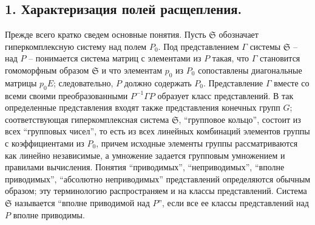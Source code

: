 \documentclass[11pt]{article}
\newcommand{\mS}{\mathfrak{S}}
\begin{document}
\subsection*{1. Характеризация полей расщепления.}

\noindent Прежде всего кратко сведем основные понятия. Пусть $\mS$ обозначает гиперкомплексную систему над полем $P_0$. Под представлением $\Gamma$ системы $\mS$ -- над $P$ -- понимается система матриц с элементами из $P$ такая, что $\Gamma$ становится гомоморфным образом $\mS$ и что элементам $p_0$ из $P_0$ сопоставлены диагональные матрицы $p_0E$; следовательно, $P$ должно содержать $P_0$. Представление $\Gamma$ вместе со всеми своими преобразованными $P^{-1}\Gamma P$ образует класс представлений. В так определенные представления входят также представления конечных групп $G$; соответствующая гиперкомплексная система $\mS$, “групповое кольцо”, состоит из всех “групповых чисел”, то есть из всех линейных комбинаций элементов группы с коэффициентами из $P_0$, причем исходные элементы группы рассматриваются как линейно независимые, а умножение задается групповым умножением и правилами вычисления. Понятия “приводимых”, “неприводимых”, “вполне приводимых”, “абсолютно неприводимых” представлений определяются обычным образом; эту терминологию распространяем и на классы представлений. Система $\mS$ называется “вполне приводимой над $P$”, если все ее классы представлений над $P$ вполне приводимы.
\end{document}
